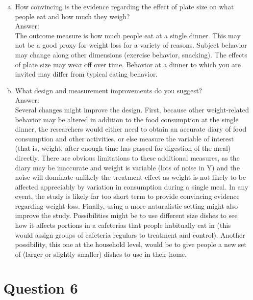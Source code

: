 \documentclass[11pt,notitlepage]{article}\usepackage[]{graphicx}\usepackage[]{color}
\makeatletter
\newenvironment{kframe}{%
 \def\at@end@of@kframe{}%
 \ifinner\ifhmode%
  \def\at@end@of@kframe{\end{minipage}}%
  \begin{minipage}{\columnwidth}%
 \fi\fi%
 \def\FrameCommand##1{\hskip\@totalleftmargin \hskip-\fboxsep
 \colorbox{shadecolor}{##1}\hskip-\fboxsep
     \hskip-\linewidth \hskip-\@totalleftmargin \hskip\columnwidth}%
 \MakeFramed {\advance\hsize-\width
   \@totalleftmargin\z@ \linewidth\hsize
   \@setminipage}}%
 {\par\unskip\endMakeFramed%
 \at@end@of@kframe}
\newenvironment{knitrout}{}{} %
\makeatother
\begin{document}
\begin{enumerate}[a)]
\item How convincing is the evidence regarding the effect of plate size on what people eat and how much they weigh?\\
Answer:\\
The outcome measure is how much people eat at a single dinner. This may not be a good proxy for weight loss for a variety of reasons. Subject behavior may change along other dimensions (exercise behavior, snacking). The effects of plate size may wear off over time. Behavior at a dinner to which you are invited may differ from typical eating behavior. 

\item What design and measurement improvements do you suggest?\\
Answer:\\
Several changes might improve the design.  First, because other weight-related behavior may be altered in addition to the food consumption at the single dinner, the researchers would either need to obtain an accurate diary of food consumption and other activities, or else measure the variable of interest (that is, weight, after enough time has passed for digestion of the meal) directly.  There are obvious limitations to these additional measures, as the diary may be inaccurate and weight is variable (lots of noise in Y) and the noise will dominate unlikely the treatment effect as weight is not likely to be affected appreciably by variation in consumption during a single meal. In any event, the study is likely far too short term to provide convincing evidence regarding weight loss.  Finally, using a more naturalistic setting might also improve the study. Possibilities might be to use different size dishes to see how it affects portions in a cafeterias that people habitually eat in (this would assign groups of cafeteria regulars to treatment and control). Another possibility, this one at the household level, would be to give people a new set of (larger or slightly smaller) dishes to use in their home. 
\end{enumerate}

\section*{Question 6}
\begin{knitrout}
\color{fgcolor}\begin{kframe}
\begin{verbatim}






\end{verbatim}
\end{kframe}
\end{knitrout}
\end{document}

